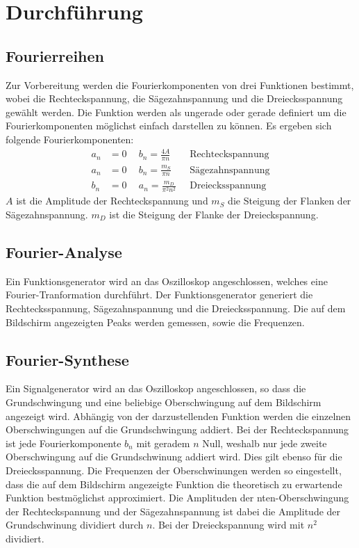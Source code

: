 \section{Durchführung}
\label{sec:Durchführung}

\subsection{Fourierreihen}
Zur Vorbereitung werden die Fourierkomponenten von drei Funktionen bestimmt, wobei
die Rechteckspannung, die Sägezahnspannung und die Dreiecksspannung gewählt werden. Die Funktion werden als ungerade oder
gerade definiert um die Fourierkomponenten möglichst einfach darstellen zu können.
Es ergeben sich folgende Fourierkomponenten:
\begin{align}
  a_n &= 0 \:\: &b_n = \frac{4A}{\pi n}  \:\:\:\:\: &\text{Rechteckspannung} \\
  a_n &= 0 \:\: &b_n = \frac{m_S}{\pi n}   \:\:\:\:\: &\text{Sägezahnspannung} \\
  b_n &= 0 \:\: &a_n = \frac{m_D}{\pi^2 n^2} \:   &\text{Dreiecksspannung}
\end{align}
$A$ ist die Amplitude der Rechteckspannung und $m_S$ die Steigung der Flanken der Sägezahnspannung.
$m_D$ ist die Steigung der Flanke der Dreieckspannung.


\subsection{Fourier-Analyse}
Ein Funktionsgenerator wird an das Oszilloskop angeschlossen, welches eine Fourier-Tranformation
durchführt. Der Funktionsgenerator generiert die Rechtecksspannung, Sägezahnspannung und die
Dreiecksspannung. Die auf dem Bildschirm angezeigten Peaks werden gemessen, sowie die
Frequenzen.

\subsection{Fourier-Synthese}
Ein Signalgenerator wird an das Oszilloskop angeschlossen, so dass die Grundschwingung und eine
beliebige Oberschwingung auf dem Bildschirm angezeigt wird. Abhängig von der
darzustellenden Funktion werden die einzelnen Oberschwingungen auf die Grundschwingung addiert.
Bei der Rechteckspannung ist jede Fourierkomponente $b_n$ mit geradem $n$ Null, weshalb nur jede zweite
Oberschwingung auf die Grundschwinung addiert wird. Dies gilt ebenso für die Dreiecksspannung.
Die Frequenzen der Oberschwinungen werden so eingestellt, dass die auf dem Bildschirm angezeigte
Funktion die theoretisch zu erwartende Funktion bestmöglichst approximiert. Die
Amplituden der nten-Oberschwingung der Rechteckspannung und der Sägezahnspannung ist dabei die Amplitude der Grundschwinung dividiert durch $n$.
Bei der Dreieckspannung wird mit $n^2$ dividiert.
